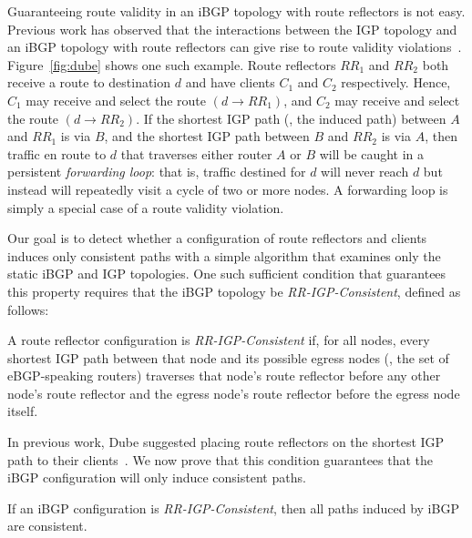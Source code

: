 Guaranteeing route validity in an iBGP topology with route reflectors is
not easy.  Previous work has observed that the interactions between the
IGP topology and an iBGP topology with route reflectors can give rise to route
validity violations~\cite{Dube99}.  Figure~\ref{fig:dube} shows one such
example.  Route reflectors $RR_1$ and $RR_2$ both receive a route to
destination $d$ and have clients $C_1$ and $C_2$ respectively.  Hence,
$C_1$ may receive and select the route $(d \rightarrow RR_1)$, and $C_2$
may receive and select the route $(d \rightarrow RR_2)$.  If the
shortest IGP path (\ie, the induced path) between $A$ and $RR_1$ is via
$B$, and the shortest 
IGP path between $B$ and $RR_2$ is via $A$, then traffic en route to $d$
that traverses either router $A$ or $B$ will be caught in a persistent
{\em forwarding loop}: that is, traffic destined for $d$ will never
reach $d$ but instead will repeatedly visit a cycle of two or
more nodes.  A forwarding loop is simply a special case of a route
validity violation.

Our goal is to detect whether a configuration of route reflectors and
clients induces only consistent paths with a simple algorithm that
examines only the static iBGP and IGP topologies.  One such sufficient
condition that guarantees this property requires that the iBGP topology
be {\em RR-IGP-Consistent}, defined as follows:

\begin{defn}\label{defn:igp-consistent}
A route reflector configuration is {\em RR-IGP-Consistent} if, for all
nodes, every shortest IGP path between that node and its possible egress
nodes (\ie, the set of eBGP-speaking routers) traverses that node's
route reflector before any other node's route reflector and the egress
node's route reflector before the egress node itself.
\end{defn}
In previous work, Dube suggested placing route
reflectors on the shortest IGP path to their clients~\cite{Dube99}.  We
now prove that this condition guarantees that the iBGP configuration
will only induce consistent paths.  

\begin{theorem}\label{th:rr_safe}
If an iBGP configuration is {\em RR-IGP-Consistent}, then
all paths induced by iBGP are consistent.
\end{theorem}

